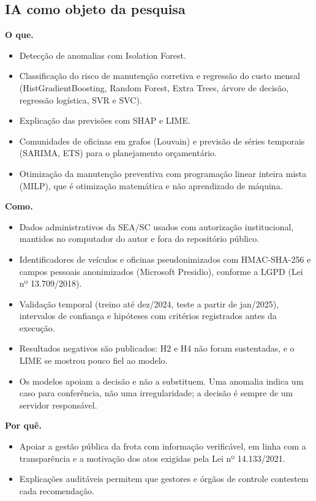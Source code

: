 \documentclass[12pt,a4paper]{article}
\begin{document}
\subsection{IA como objeto da pesquisa}
\textbf{O que.}
\begin{itemize}
  \item Detecção de anomalias com Isolation Forest.
  \item Classificação do risco de manutenção corretiva e regressão do custo mensal (HistGradientBoosting, Random Forest, Extra Trees, árvore de decisão, regressão logística, SVR e SVC).
  \item Explicação das previsões com SHAP e LIME.
  \item Comunidades de oficinas em grafos (Louvain) e previsão de séries temporais (SARIMA, ETS) para o planejamento orçamentário.
  \item Otimização da manutenção preventiva com programação linear inteira mista (MILP), que é otimização matemática e não aprendizado de máquina.
\end{itemize}
\textbf{Como.}
\begin{itemize}
  \item Dados administrativos da SEA/SC usados com autorização institucional, mantidos no computador do autor e fora do repositório público.
  \item Identificadores de veículos e oficinas pseudonimizados com HMAC-SHA-256 e campos pessoais anonimizados (Microsoft Presidio), conforme a LGPD (Lei nº 13.709/2018).
  \item Validação temporal (treino até dez/2024, teste a partir de jan/2025), intervalos de confiança e hipóteses com critérios registrados antes da execução.
  \item Resultados negativos são publicados: H2 e H4 não foram sustentadas, e o LIME se mostrou pouco fiel ao modelo.
  \item Os modelos apoiam a decisão e não a substituem. Uma anomalia indica um caso para conferência, não uma irregularidade; a decisão é sempre de um servidor responsável.
\end{itemize}
\textbf{Por quê.}
\begin{itemize}
  \item Apoiar a gestão pública da frota com informação verificável, em linha com a transparência e a motivação dos atos exigidas pela Lei nº 14.133/2021.
  \item Explicações auditáveis permitem que gestores e órgãos de controle contestem cada recomendação.
\end{itemize}
\end{document}
